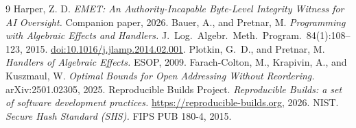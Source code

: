 \documentclass[11pt]{article}
\begin{document}
\begin{thebibliography}{9}
\small
{} Harper, Z. D. \emph{EMET: An Authority-Incapable Byte-Level Integrity Witness for AI Oversight.} Companion paper, 2026.
 Bauer, A., and Pretnar, M. \emph{Programming with Algebraic Effects and Handlers.} J.~Log.~Algebr.~Meth.~Program.\ 84(1):108--123, 2015. \href{https://doi.org/10.1016/j.jlamp.2014.02.001}{doi:10.1016/j.jlamp.2014.02.001}.
 Plotkin, G.~D., and Pretnar, M. \emph{Handlers of Algebraic Effects.} ESOP, 2009.
 Farach-Colton, M., Krapivin, A., and Kuszmaul, W. \emph{Optimal Bounds for Open Addressing Without Reordering.} arXiv:2501.02305, 2025.
 Reproducible Builds Project. \emph{Reproducible Builds: a set of software development practices.} \url{https://reproducible-builds.org}, 2026.
 NIST. \emph{Secure Hash Standard (SHS).} FIPS PUB 180-4, 2015.
\end{thebibliography}
\end{document}
